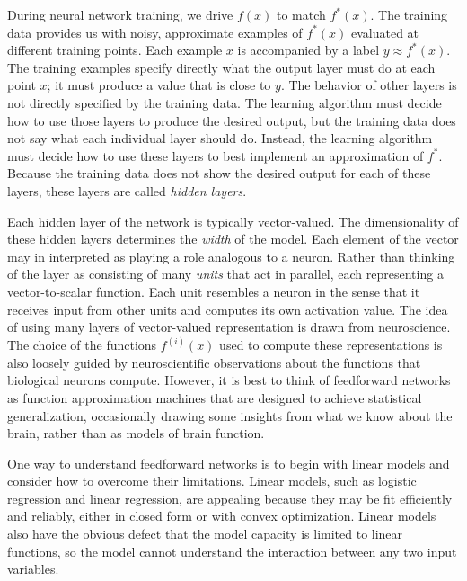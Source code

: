 \documentclass{report}
\begin{document}
\noindent During neural network training, we drive $f(x)$ to match $f^*(x)$. The training data provides us with noisy, approximate examples of $f^*(x)$ evaluated at different training points. Each example $x$ is accompanied by a label $y \approx f^*(x)$. The training examples specify directly what the output layer must do at each point $x$; it must produce a value that is close to $y$. The behavior of other layers is not directly specified by the training data. The learning algorithm must decide how to use those layers to produce the desired output, but the training data does not say what each individual layer should do. Instead, the learning algorithm must decide how to use these layers to best implement an approximation of $f^*$. Because the training data does not show the desired output for each of these layers, these layers are called \textit{hidden layers}.\newline

\noindent Each hidden layer of the network is typically vector-valued. The dimensionality of these hidden layers determines the \textit{width} of the model. Each element of the vector may in interpreted as playing a role analogous to a neuron. Rather than thinking of the layer as consisting of many \textit{units} that act in parallel, each representing a vector-to-scalar function. Each unit resembles a neuron in the sense that it receives input from other units and computes its own activation value. The idea of using many layers of vector-valued representation is drawn from neuroscience. The choice of the functions $f^{(i)}(x)$ used to compute these representations is also loosely guided by neuroscientific observations about the functions that biological neurons compute. However, it is best to think of feedforward networks as function approximation machines that are designed to achieve statistical generalization, occasionally drawing some insights from what we know about the brain, rather than as models of brain function.\newline

\noindent One way to understand feedforward networks is to begin with linear models and consider how to overcome their limitations. Linear models, such as logistic regression and linear regression, are appealing because they may be fit efficiently and reliably, either in closed form or with convex optimization. Linear models also have the obvious defect that the model capacity is limited to linear functions, so the model cannot understand the interaction between any two input variables.\newline
\end{document}
